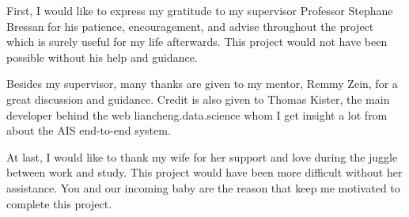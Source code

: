 \begin{acknowledgments}
First, I would like to express my gratitude to my supervisor Professor Stephane Bressan for his patience, encouragement, and advise throughout the project which is surely useful for my life afterwards. This project would not have been possible without his help and guidance.

Besides my supervisor, many thanks are given to my mentor, Remmy Zein, for a great discussion and guidance. Credit is also given to Thomas Kister, the main developer behind the web liancheng.data.science whom I get insight a lot from about the AIS end-to-end system.

At last, I would like to thank my wife for her support and love during the juggle between work and study. This project would have been more difficult without her assistance. You and our incoming baby are the reason that keep me motivated to complete this project. 
\end{acknowledgments}
